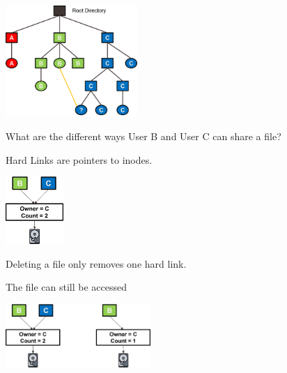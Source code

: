 \begin{slide}


    \includegraphics[width=50mm]{sharing-data-1.png}
    \bigskip

    What are the different ways User B and User C can share a file?

\end{slide}

\begin{slide}


    Hard Links are pointers to inodes.

    \medskip
    \includegraphics[width=22mm]{hard-link.png}
    \medskip

    Deleting a file only removes one hard link.
    
    The file can still be accessed

    \medskip
    \includegraphics[width=55mm]{hard-link-removal.png}

\end{slide}

